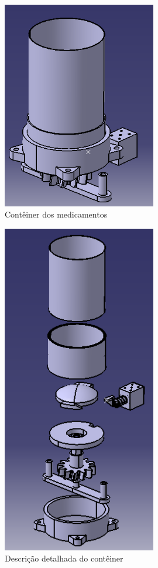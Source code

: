 \begin{apendicesenv}
\begin{figure}[H]
    \centering
    \includegraphics[width=0.6\textwidth]{figuras/estrutura/Conteiner.png}
    \caption{Contêiner dos medicamentos}
    \label{fig:conteiner}
\end{figure}

\begin{figure}[H]
    \centering
    \includegraphics[width=0.6\textwidth]{figuras/estrutura/Descrição Contêiner.png}
    \caption{Descrição detalhada do contêiner}
    \label{fig:DescricaoConteiner}
\end{figure}



\end{apendicesenv}
